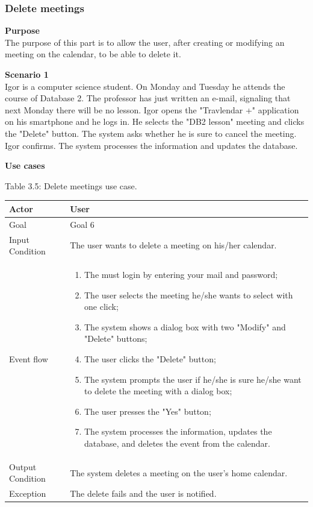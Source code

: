 \documentclass{article}
\begin{document}
	\subsubsection{Delete meetings}
	
	\bigskip
	\noindent
	\textbf{Purpose} \\
	The purpose of this part is to allow the user, after creating or modifying an meeting on the calendar, to be able to delete it.
	
	\bigskip
	\noindent
	\textbf{Scenario 1} \\
	Igor is a computer science student. On Monday and Tuesday he attends the course of Database 2. The professor has just written an e-mail, signaling that next Monday there will be no lesson. Igor opens the "Travlendar +" application on his smartphone and he logs in. He selects the "DB2 lesson" meeting and clicks the "Delete" button. The system asks whether he is sure to cancel the meeting. Igor confirms. The system processes the information and updates the database.
	
	\bigskip
	\noindent
	\textbf{Use cases} \\
	
	\begin{center}
		Table 3.5: Delete meetings use case.
		
		\bigskip
    		\begin{tabular}{p{}|p{}}
   		 	\hline
    			Actor & User \\ \hline
    			Goal & Goal 6 \\ \hline
    			Input Condition & The user wants to delete a meeting on his/her calendar. \\ \hline
    			Event flow & 
			\begin{enumerate}
  				\item The must login by entering your mail and password;
  				\item The user selects the meeting he/she wants to select with one click;
  				\item The system shows a dialog box with two "Modify" and "Delete" buttons;
  				\item The user clicks the "Delete" button;
  				\item The system prompts the user if he/she is sure he/she want to delete the meeting with a dialog box;
  				\item The user presses the "Yes" button;
  				\item The system processes the information, updates the database, and deletes the event from the calendar.
 			 \end{enumerate} \\ \hline
    			Output Condition & The system deletes a meeting on the user's home calendar. \\ \hline
    			Exception & The delete fails and the user is notified. \\ \hline
    		\end{tabular}
	\end{center}
	
\end{document}
